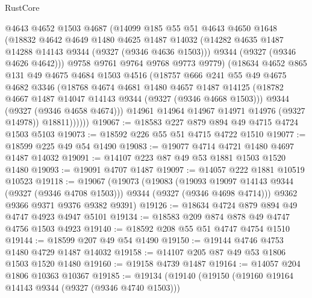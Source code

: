 \begin{lexlean}{RustCore}
\begin{coremodule}
              @4643
              @4652
              @1503
              @4687
              (@14099
                @185
                @55
                @51
                @4643
                @4650
                @1648
                (@18832
                  @4642
                  @4649
                  @1480
                  @4625
                  @1487
                  @14032
                  (@14282 @4635 @1487 @14288 @14143 @9344 (@9327 (@9346 @4636 @1503)))
                  @9344
                  (@9327 (@9346 @4626 @4642)))
                @9758
                @9761
                @9764
                @9768
                @9773
                @9779)
              (@18634
                @4652
                @865
                @131
                @49
                @4675
                @4684
                @1503
                @4516
                (@18757
                  @666
                  @241
                  @55
                  @49
                  @4675
                  @4682
                  @3346
                  (@18768
                    @4674
                    @4681
                    @1480
                    @4657
                    @1487
                    @14125
                    (@18782 @4667 @1487 @14047 @14143 @9344 (@9327 (@9346 @4668 @1503)))
                    @9344
                    (@9327 (@9346 @4658 @4674)))
                  @14961
                  @14964
                  @14967
                  @14971
                  @14976
                  (@9327 @14978))
                @18811))))))
@19067 := @18583 @227 @879 @894 @49 @4715 @4724 @1503 @5103
@19073 := @18592 @226 @55 @51 @4715 @4722 @1510
@19077 := @18599 @225 @49 @54 @1490
@19083 := @19077 @4714 @4721 @1480 @4697 @1487 @14032
@19091 := @14107 @223 @87 @49 @53 @1881 @1503 @1520 @1480
@19093 := @19091 @4707 @1487
@19097 := @14057 @222 @1881 @10519 @10523
@19118 := @19067
    (@19073
      (@19083
        (@19093 @19097 @14143 @9344 (@9327 (@9346 @4708 @1503)))
        @9344
        (@9327 (@9346 @4698 @4714)))
      @9362
      @9366
      @9371
      @9376
      @9382
      @9391)
@19126 := @18634 @4724 @879 @894 @49 @4747 @4923 @4947 @5101
@19134 := @18583 @209 @874 @878 @49 @4747 @4756 @1503 @4923
@19140 := @18592 @208 @55 @51 @4747 @4754 @1510
@19144 := @18599 @207 @49 @54 @1490
@19150 := @19144 @4746 @4753 @1480 @4729 @1487 @14032
@19158 := @14107 @205 @87 @49 @53 @1806 @1503 @1520 @1480
@19160 := @19158 @4739 @1487
@19164 := @14057 @204 @1806 @10363 @10367
@19185 := @19134
    (@19140
      (@19150
        (@19160 @19164 @14143 @9344 (@9327 (@9346 @4740 @1503)))

\end{coremodule}
\end{lexlean}
